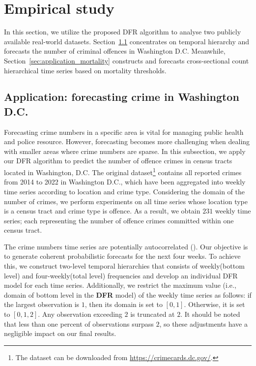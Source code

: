 \documentclass[a4paper,review,12pt,authoryear]{elsarticle}
\begin{document}
     \section{Empirical study}
     \label{sec:application}
     In this section, we utilize the proposed DFR algorithm to analyse two publicly available real-world datasets.
     Section~\ref{sec:application_crime} concentrates on temporal hierarchy and forecasts the number of criminal offences in Washington D.C. 
     Meanwhile, Section~\ref{sec:application_mortality} constructs and forecasts cross-sectional count hierarchical time series based on mortality thresholds. 
     
     \subsection{Application: forecasting crime in Washington D.C.}
     \label{sec:application_crime}
     
     Forecasting crime numbers in a specific area is vital for managing public health and police resource.
     However, forecasting becomes more challenging when dealing with smaller areas where crime numbers are sparse.
     In this subsection, we apply our DFR algorithm to predict the number of offence crimes in census tracts located in Washington, D.C. 
     The original dataset\footnote{The dataset can be downloaded from \url{https://crimecards.dc.gov/}.} contains all reported crimes from 2014 to 2022 in Washington D.C., which have been aggregated into weekly time series according to location and crime type. 
     Considering the domain of the number of crimes, we perform experiments on all time series whose location type is a census tract and crime type is offence.
     As a result, we obtain $231$ weekly time series; each representing the number of offence crimes committed within one census tract.
     
     The crime numbers time series are potentially autocorrelated (\citealp{aldor-noimanSpatioTemporalLowCount2013}). 
     Our objective is to generate coherent probabilistic forecasts for the next four weeks.
     To achieve this, we construct two-level temporal hierarchies that consists of weekly(bottom level) and four-weekly(total level) frequencies and develop an individual DFR model for each time series.
     Additionally, we restrict the maximum value (i.e., domain of bottom level in the \textbf{DFR} model) of the weekly time series as follows: if the largest observation is $1$, then its domain is set to $[0, 1]$. 
     Otherwise, it is set to $[0, 1, 2]$. 
     Any observation exceeding $2$ is truncated at $2$. 
     It should be noted that less than one percent of observations surpass $2$, so these adjustments have a negligible impact on our final results.
     
\end{document}

